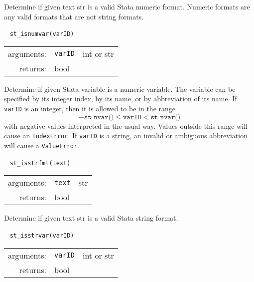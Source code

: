 \documentclass{article}
\begin{document}
			\vspace{1.5mm}
			\noindent Determine if given text str is a valid Stata numeric format. Numeric formats are any valid formats that are not string formats. \newline
			
			
			\ \newline
			\noindent \lstinline$st_isnumvar(varID)$
								
			\vspace{1.5mm}
			\noindent 
			\indent \begin{tabular}{rrl}
					arguments: & \texttt{varID} & int or str \\
					returns: & \multicolumn{2}{l}{bool}
				\end{tabular}
								
			\vspace{1.5mm}
			\noindent Determine if given Stata variable is a numeric variable. The variable can be specified by its integer index, by its name, or by abbreviation of its name. If \lstinline{varID} is an integer, then it is allowed to be in the range
			\[
				-\texttt{st\_nvar()} \leq \texttt{varID} < \texttt{st\_nvar()}
			\]
			with negative values interpreted in the usual way. Values outside this range will cause an \lstinline{IndexError}. If \lstinline{varID} is a string, an invalid or ambiguous abbreviation will cause a \lstinline{ValueError}. \newline
			
			
			\ \newline
			\noindent \lstinline$st_isstrfmt(text)$
								
			\vspace{1.5mm}
			\noindent 
			\indent \begin{tabular}{rrl}
					arguments: & \texttt{text} & str \\
					returns: & \multicolumn{2}{l}{bool}
				\end{tabular}
								
			\vspace{1.5mm}
			\noindent Determine if given text str is a valid Stata string format. \newline
			
						
			\ \newline
			\noindent \lstinline$st_isstrvar(varID)$
								
			\vspace{1.5mm}
			\noindent 
			\indent \begin{tabular}{rrl}
					arguments: & \texttt{varID} & int or str \\
					returns: & \multicolumn{2}{l}{bool}
				\end{tabular}
								
\end{document}
